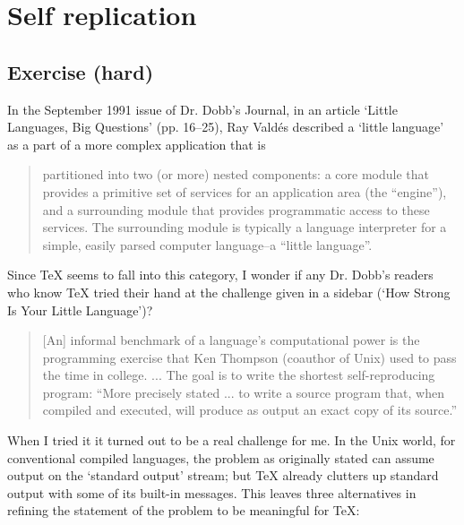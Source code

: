 \chapter{Self replication}

\section{Exercise (hard)}

\begin{comment}
[Posted to info-tex on 4 Nov 91; see exercise.004]
**********************************************************************
*** Exercise 7 (hard):
\end{comment}


In the September 1991 issue of Dr. Dobb's Journal, in an article
`Little Languages, Big Questions' (pp. 16--25), Ray Vald\'es
described a `little language' as a part of a more complex
application that is
\begin{quote}
     partitioned into two (or more) nested components: a core module
     that provides a primitive set of services for an application area
     (the ``engine''), and a surrounding module that provides
     programmatic access to these services. The surrounding module is
     typically a language interpreter for a simple, easily parsed
     computer language--a ``little language''.
\end{quote}

Since TeX seems to fall into this category, I wonder if any Dr. Dobb's
readers who know TeX tried their hand at the challenge given in a
sidebar (`How Strong Is Your Little Language')?
\begin{quote}
     [An] informal benchmark of a language's computational power is the
     programming exercise that Ken Thompson (coauthor of Unix) used to
     pass the time in college. ... The goal is to write the shortest
     self-reproducing program: ``More precisely stated ... to write a
     source program that, when compiled and executed, will produce as
     output an exact copy of its source.''
\end{quote}

When I tried it it turned out to be a real challenge for me. In the
Unix world, for conventional compiled languages, the problem as
originally stated can assume output on the `standard output' stream;
but TeX already clutters up standard output with some of its built-in
messages. This leaves three alternatives in refining the statement of
the problem to be meaningful for TeX:

